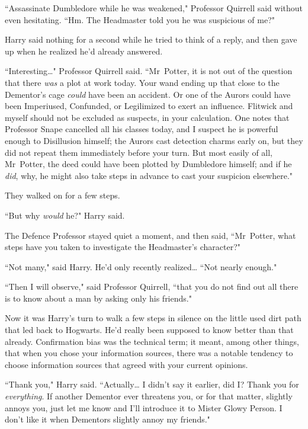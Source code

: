 ``Assassinate Dumbledore while he was weakened," Professor Quirrell said without even hesitating. ``Hm. The Headmaster told you he was suspicious of me?"

Harry said nothing for a second while he tried to think of a reply, and then gave up when he realized he'd already answered.

``Interesting{\ldots}" Professor Quirrell said. ``Mr~Potter, it is not out of the question that there \emph{was} a plot at work today. Your wand ending up that close to the Dementor's cage \emph{could} have been an accident. Or one of the Aurors could have been Imperiused, Confunded, or Legilimized to exert an influence. Flitwick and myself should not be excluded as suspects, in your calculation. One notes that Professor Snape cancelled all his classes today, and I suspect he is powerful enough to Disillusion himself; the Aurors cast detection charms early on, but they did not repeat them immediately before your turn. But most easily of all, Mr~Potter, the deed could have been plotted by Dumbledore himself; and if he \emph{did}, why, he might also take steps in advance to cast your suspicion elsewhere."

They walked on for a few steps.

``But why \emph{would} he?" Harry said.

The Defence Professor stayed quiet a moment, and then said, ``Mr~Potter, what steps have you taken to investigate the Headmaster's character?"

``Not many," said Harry. He'd only recently realized{\ldots} ``Not nearly enough."

``Then I will observe," said Professor Quirrell, ``that you do not find out all there is to know about a man by asking only his friends."

Now it was Harry's turn to walk a few steps in silence on the little used dirt path that led back to Hogwarts. He'd really been supposed to know better than that already. Confirmation bias was the technical term; it meant, among other things, that when you chose your information sources, there was a notable tendency to choose information sources that agreed with your current opinions.

``Thank you," Harry said. ``Actually{\ldots} I didn't say it earlier, did I? Thank you for \emph{everything}. If another Dementor ever threatens you, or for that matter, slightly annoys you, just let me know and I'll introduce it to Mister Glowy Person. I don't like it when Dementors slightly annoy my friends."


